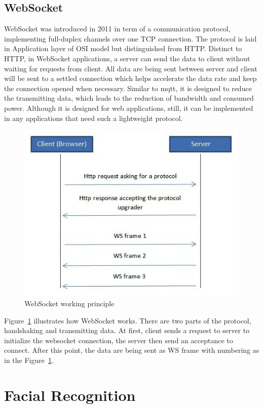   \subsection{WebSocket}
    WebSocket was introduced in 2011 in term of a communication protocol, implementing full-duplex channels over one TCP connection. The protocol is laid in Application layer of OSI model but distinguished from HTTP. Distinct to HTTP, in WebSocket applications, a server can send the data to client without waiting for requests from client. All data are being sent between server and client will be sent to a settled connection which helps accelerate the data rate and keep the connection opened when necessary. Similar to \gls{mqtt}, it is designed to reduce the transmitting data, which leads to the reduction of bandwidth and consumed power. Although it is designed for web applications, still, it can be implemented in any applications that need such a lightweight protocol.
    \begin{figure}[!ht]
      \begin{center}
        \includegraphics[scale=0.7]{images/ws-1.jpg}
        \caption{WebSocket working principle}
        \label{fig:wsPrinciple}
      \end{center}
    \end{figure}
    Figure~\ref{fig:wsPrinciple} illustrates how WebSocket works. There are two parts of the protocol, handshaking and transmitting data. At first, client sends a request to server to initialize the websocket connection, the server then send an acceptance to connect. After this point, the data are being sent as WS frame with numbering as in the Figure~\ref{fig:wsPrinciple}.

\section{Facial Recognition}





  


